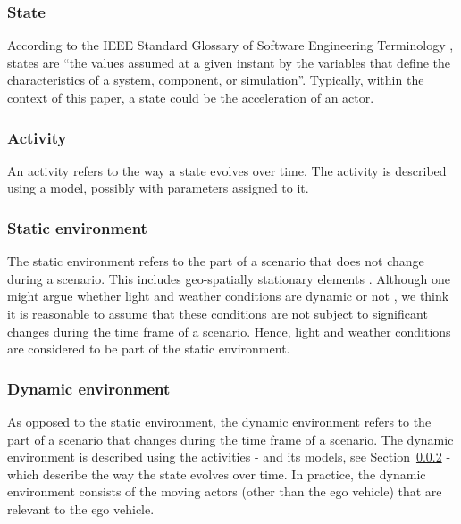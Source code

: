 \subsubsection{State}
\label{sec:state}
According to the IEEE Standard Glossary of Software Engineering Terminology \cite{ieee1990glossary}, states are ``the values assumed at a given instant by the variables that define the characteristics of a system, component, or simulation''. Typically, within the context of this paper, a state could be the acceleration of an actor.

\subsubsection{Activity}
\label{sec:activity}
An activity refers to the way a state evolves over time. The activity is described using a model, possibly with parameters assigned to it.

\subsubsection{Static environment}
\label{sec:static environment}
The static environment refers to the part of a scenario that does not change during a scenario. This includes geo-spatially stationary elements \cite{ulbrich2015}. Although one might argue whether light and weather conditions are dynamic or not \cite{geyer2014,bach2016modelbased}, we think it is reasonable to assume that these conditions are not subject to significant changes during the time frame of a scenario. Hence, light and weather conditions are considered to be part of the static environment.

\subsubsection{Dynamic environment}
\label{sec:dynamic environment}
As opposed to the static environment, the dynamic environment refers to the part of a scenario that changes during the time frame of a scenario. The dynamic environment is described using the activities - and its models, see Section~\ref{sec:activity} - which describe the way the state evolves over time. In practice, the dynamic environment consists of the moving actors (other than the ego vehicle) that are relevant to the ego vehicle.
